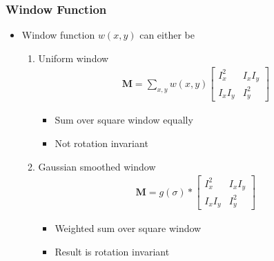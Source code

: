 \documentclass[letterpaper,12pt]{article}
\newcommand{\matr}[1]{\mathbf{#1}}
\begin{document}
\subsubsection{Window Function}
\begin{itemize}
 \item Window function $w(x,y)$ can either be
       \begin{enumerate}
        \item Uniform window
              \begin{align}
               \matr{M} = \sum\limits_{x,y} w(x,y)
               \begin{bmatrix}
                I^2_x   & I_x I_y \\
                I_x I_y & I^2_y
               \end{bmatrix}
              \end{align}
              \begin{itemize}
               \item Sum over square window equally
               \item Not rotation invariant
              \end{itemize}
        \item Gaussian smoothed window
              \begin{align}
               \matr{M} = g(\sigma) *
               \begin{bmatrix}
                I^2_x   & I_x I_y \\
                I_x I_y & I^2_y
               \end{bmatrix}
              \end{align}
              \begin{itemize}
               \item Weighted sum over square window
               \item Result is rotation invariant
              \end{itemize}
       \end{enumerate}
\end{itemize}
\end{document}
